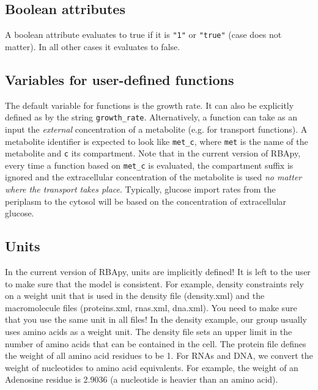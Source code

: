 \documentclass[12pt]{scrartcl}
\begin{document}
\subsection{Boolean attributes}

A boolean attribute evaluates to true if it is \texttt{"1"}
or \texttt{"true"} (case does not matter).
In all other cases it evaluates to false.

\subsection{Variables for user-defined functions}

The default variable for functions is the growth rate.
It can also be explicitly defined as by the string \texttt{growth\_rate}.
Alternatively, a function can take as an input the \emph{external}
concentration of a metabolite (e.g. for transport functions).
A metabolite identifier is expected to look like \texttt{met\_c},
where \texttt{met} is the name of the metabolite
and \texttt{c} its compartment.
Note that in the current version of RBApy,
every time a function based on \texttt{met\_c} is evaluated,
the compartment suffix is ignored and the extracellular concentration of the metabolite is used
\emph{no matter where the transport takes place}.
Typically, glucose import rates from the periplasm to the cytosol
will be based on the concentration of extracellular glucose.

\subsection{Units}

In the current version of RBApy, units are implicitly defined!
It is left to the user to make sure that the model is consistent.
For example, density constraints rely on a weight unit that is used in the
density file (density.xml) and the macromolecule files (proteins.xml, rnas.xml,
dna.xml).
You need to make sure that you use the same unit in all files!
In the density example, our group usually uses amino acids as a weight unit.
The density file sets an upper limit in the number of amino acids that can be
contained in the cell.
The protein file defines the weight of all amino acid residues to be 1.
For RNAs and DNA, we convert the weight of nucleotides to amino acid equivalents.
For example, the weight of an Adenosine residue is 2.9036
(a nucleotide is heavier than an amino acid).








\end{document}
